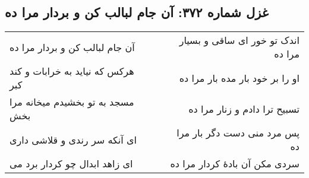 \begin{center}
\section*{غزل شماره ۳۷۲: آن جام لبالب کن و بردار مرا ده}
\label{sec:372}
\begin{longtable}{l p{0.5cm} r}
آن جام لبالب کن و بردار مرا ده
&&
اندک تو خور ای ساقی و بسیار مرا ده
\\
هرکس که نیاید به خرابات و کند کبر
&&
او را بر خود بار مده بار مرا ده
\\
مسجد به تو بخشیدم میخانه مرا بخش
&&
تسبیح ترا دادم و زنار مرا ده
\\
ای آنکه سر رندی و قلاشی داری
&&
پس مرد منی دست دگر بار مرا ده
\\
ای زاهد ابدال چو کردار برد می
&&
سردی مکن آن بادهٔ کردار مرا ده
\\
\end{longtable}
\end{center}
